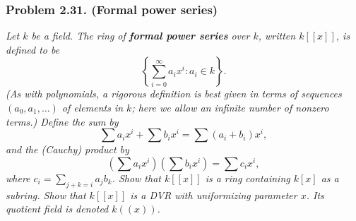 \documentclass{article}
\begin{document}



\subsubsection*{Problem 2.31. (Formal power series)}
\emph{Let $k$ be a field.
The ring of \textbf{formal power series} over $k$,
written $k[[x]]$,
is defined to be
\[
  \left\{ \sum_{i=0}^{\infty} a_i x^i : a_i \in k \right\}.
\]
(As with polynomials,
a rigorous definition is best given in terms of sequences
$(a_0,a_1,\ldots)$ of elements in $k$;
here we allow an infinite number of nonzero terms.)
Define the sum by
\[
  \sum a_i x^i + \sum b_i x^i = \sum (a_i + b_i) x^i,
\]
and the (Cauchy) product by
\[
  \left( \sum a_i x^i \right)\left( \sum b_i x^i \right) = \sum c_i x^i,
\]
where $c_i = \sum_{j+k=i} a_j b_k$.
Show that $k[[x]]$ is a ring containing $k[x]$ as a subring.
Show that $k[[x]]$ is a DVR with uniformizing parameter $x$.
Its quotient field is denoted $k((x))$.} \\
\end{document}
